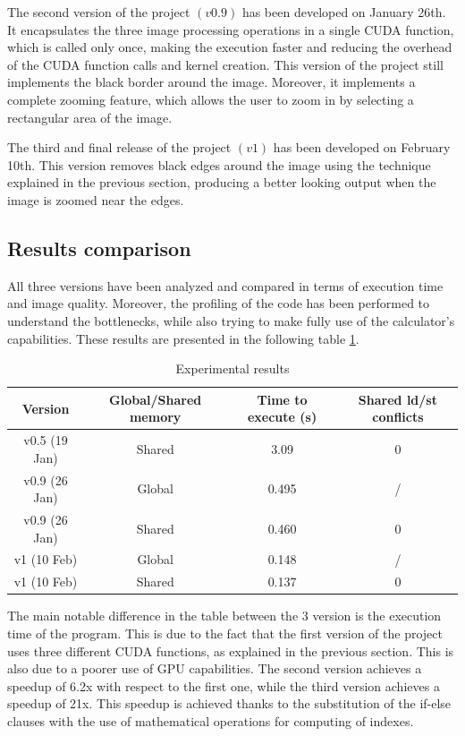     The second version of the project $(v0.9)$ has been developed on January 26th. It encapsulates the three image processing operations in a single CUDA function,
    which is called only once, making the execution faster and reducing the overhead of the CUDA function calls and kernel creation. 
    This version of the project still implements the black border around the image.
    Moreover, it implements a complete zooming feature, which allows the user to zoom in by selecting a rectangular area of the image.

    The third and final release of the project $(v1)$ has been developed on February 10th.
    This version removes black edges around the image using the technique explained in the previous section, producing a better looking output when the image is zoomed near the edges. 

    
    \subsection{Results comparison}
    All three versions have been analyzed and compared in terms of execution time and image quality. Moreover, the profiling of the code has been performed to understand the bottlenecks, while 
    also trying to make fully use of the calculator's capabilities. 
    These results are presented in the following table \ref{tab:expres}.
    \small
    \begin{table}[ht]
        \begin{tabular}{|c|c|c|c|}
            \hline
            Version & Global/Shared memory& Time to execute (s) & Shared ld/st conflicts \\
            \hline
            v0.5 (19 Jan) & Shared & 3.09 & 0\\
            \hline
            v0.9 (26 Jan) & Global & 0.495 & /\\
            \hline
            v0.9 (26 Jan) & Shared & 0.460 & 0\\
            \hline
            v1 (10 Feb) & Global & 0.148 & /\\
            \hline
            v1 (10 Feb) & Shared & 0.137 & 0\\
            \hline
        \end{tabular}
        \caption{Experimental results}
        \label{tab:expres}
    \end{table}
    The main notable difference in the table between the 3 version is the execution time of the program. This is due to the fact that the first version of the project uses three different CUDA functions,
    as explained in the previous section. This is also due to a poorer use of GPU capabilities. 
    The second version achieves a speedup of 6.2x with respect to the first one, while the third version achieves a speedup of 21x.
    This speedup is achieved thanks to the substitution of the if-else clauses with the use of mathematical operations for computing of indexes.
    
